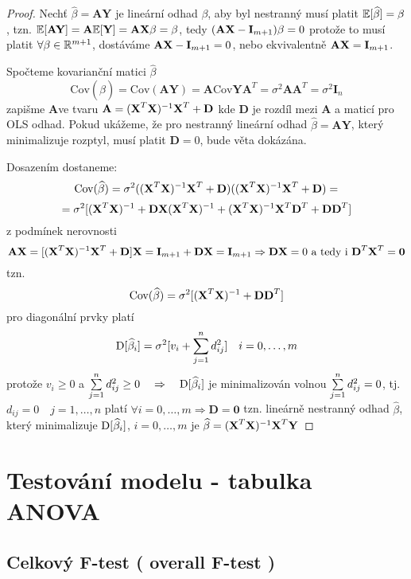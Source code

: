 \begin{proof}
	Nechť $ \widehat{\beta} = \textbf{AY} $ je lineární odhad $ \beta $, aby byl nestranný musí platit $ \mathbb{E} [ \widehat{\beta} ] = \beta $, tzn. $ \mathbb{E} [ \textbf{AY} ] = \textbf{A} \mathbb{E} [ \textbf{Y} ] = \textbf{A} \textbf{X} \beta = \beta $, tedy $ ( \textbf{A} \textbf{X} - \textbf{I}_{m+1} ) \beta = 0 $ protože to musí platit $ \forall \beta \in \mathbb{R} ^{m+1} $, dostáváme $ \textbf{A} \textbf{X} - \textbf{I}_{m+1} = 0 $, nebo ekvivalentně $ \textbf{A} \textbf{X} = \textbf{I}_{m+1} $.
	
	Spočteme kovarianční matici $ \widehat{\beta} $
$$
	\text{Cov}( \widehat{\beta} ) = \text{Cov}( \textbf{AY} ) = \textbf{A} \text{Cov} \textbf{YA}^{T} = \sigma^{2}\textbf{AA}^{T} = \sigma^{2} \textbf{I}_n
$$
zapišme \textbf{A}ve tvaru $ \textbf{A} = ( \textbf{X}^{T} \textbf{X} )^{-1} \textbf{X} ^{T} + \textbf{D} $ kde \textbf{D} je rozdíl mezi \textbf{A} a maticí pro OLS odhad.
Pokud ukážeme, že pro nestranný lineární odhad $ \widehat{\beta} = \textbf{AY} $, který minimalizuje rozptyl, musí platit $ \textbf{D} = 0 $, bude věta dokázána.

Dosazením dostaneme:
 $$
	\text{Cov}( \widehat{\beta} ) = \sigma^{2} ( ( \textbf{X}^{T} \textbf{X} )^{-1} \textbf{X} ^{T} + \textbf{D} ) ( ( \textbf{X}^{T} \textbf{X} )^{-1} \textbf{X} ^{T} + \textbf{D} ) = 
$$
$$
= \sigma^{2} [ ( \textbf{X}^{T} \textbf{X} )^{-1} + \textbf{D} \textbf{X} ( \textbf{X}^{T} \textbf{X} )^{-1} + ( \textbf{X}^{T} \textbf{X} )^{-1} \textbf{X} ^{T} \textbf{D}^{T} + \textbf{DD}^{T} ]
$$
z podmínek nerovnosti
$$
\textbf{A} \textbf{X} = [ ( \textbf{X}^{T} \textbf{X} )^{-1} \textbf{X} ^{T} + \textbf{D} ] \textbf{X} = \textbf{I}_{m+1} + \textbf{D} \textbf{X} = \textbf{I}_{m+1}  \Rightarrow  \textbf{D} \textbf{X} = 0 \text{ a tedy i } \textbf{D}^{T} \textbf{X} ^{T} = \textbf{0}
$$
tzn. 
$$
\text{Cov}( \widehat{\beta} ) = \sigma^{2} [ ( \textbf{X} ^{T} \textbf{X} )^{-1} + \textbf{DD}^{T}  ]
$$
pro diagonální prvky platí
$$
\mathrm{D} [ \widehat{\beta}_i ] = \sigma^{2} [ v_i + \sum\limits_{j=1}^{n} d_{ij}^{2}  ] \quad i = 0, \dots , m
$$
protože $ v_i \geq 0 $ a $ \sum\limits_{j=1}^{n} d_{ij}^{2} \geq 0 \quad \Rightarrow \quad \mathrm{D} [ \widehat{\beta}_i ] $ je minimalizován volnou $ \sum\limits_{j=1}^{n} d_{ij}^{2} = 0 $, tj. $ d_{ij} = 0 \quad j = 1, \dots , n $ platí $ \forall i = 0, \dots , m \Rightarrow \textbf{D} = \textbf{0} $ tzn. lineárně nestranný odhad $ \widehat{\beta} $, který minimalizuje $ \mathrm{D} [ \widehat{\beta}_i ] $, $ i = 0, \dots , m $ je $ \widehat{\beta} = ( \textbf{X} ^{T} \textbf{X} )^{-1} \textbf{X} ^{T} \textbf{Y} $
\end{proof}
\section{Testování modelu - tabulka ANOVA}
\subsection{Celkový F-test ( overall F-test )}

